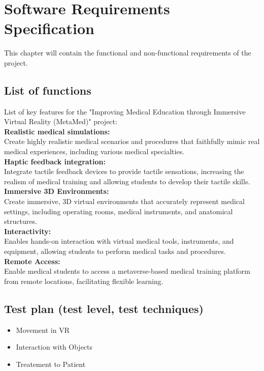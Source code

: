 \chapter{Software Requirements Specification}
\label{ch:srs}
This chapter will contain the functional and non-functional requirements of the project.
\section{List of functions}
List of key features for the "Improving Medical Education through Immersive Virtual Reality (MetaMed)" project:\\
\textbf{Realistic medical simulations:}\\ Create highly realistic medical scenarios and procedures that faithfully mimic real medical experiences, including various medical specialties.\\
\textbf{Haptic feedback integration:}\\ Integrate tactile feedback devices to provide tactile sensations, increasing the realism of medical training and allowing students to develop their tactile skills.\\
\textbf{Immersive 3D Environments:}\\ Create immersive, 3D virtual environments that accurately represent medical settings, including operating rooms, medical instruments, and anatomical structures.\\
\textbf{Interactivity:}\\Enables hands-on interaction with virtual medical tools, instruments, and equipment, allowing students to perform medical tasks and procedures.\\
\textbf{Remote Access:}\\ Enable medical students to access a metaverse-based medical training platform from remote locations, facilitating flexible learning.
\section{Test plan (test level, test techniques)}
\begin{itemize}
    \item Movement in VR 
    \item Interaction with Objects
    \item Treatement to Patient
\end{itemize}
